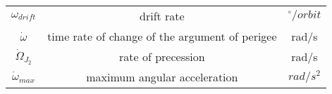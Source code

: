 \begin{center}
\begin{longtable}{c|c|c}
$\omega_{drift}$                    & drift rate                                  														& $^\circ/orbit$ \\

$\dot \omega$ 											& time rate of change of the argument of perigee 													& rad/s \\

$\dot \Omega _{J_2 }$ 							& rate of precession 																											& rad/s \\

$\dot \omega_{max}$                 & maximum angular acceleration                														& $rad/s^2$ \\ 
 
\end{longtable}
\end{center}